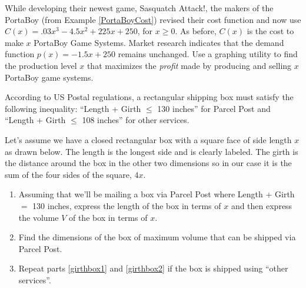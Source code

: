 \documentclass{ximera}
\begin{document}
\begin{problem}\label{newportaboycost}
While developing their newest game, Sasquatch Attack!, the makers of the PortaBoy (from Example \ref{PortaBoyCost}) revised their cost function and now use $C(x) = .03x^{3} - 4.5x^{2} + 225x + 250$, for $x \geq 0$. As before, $C(x)$ is the cost to make $x$ PortaBoy Game Systems.  Market research indicates that the demand function $p(x) = -1.5x + 250$ remains unchanged.  Use a graphing utility to find the production level $x$ that maximizes the \textit{profit} made by producing and selling $x$ PortaBoy game systems.
\end{problem}

\begin{problem}
According to US Postal regulations, a rectangular shipping box must satisfy the following inequality: ``Length + Girth $\leq$ 130 inches'' for Parcel Post and ``Length + Girth $\leq$ 108 inches'' for other services. 

Let's assume we have a closed rectangular box with a square face of side length $x$ as drawn below.  The length is the longest side and is clearly labeled.  The girth is the distance around the box in the other two dimensions so in our case it is the sum of the four sides of the square, $4x$. 

\begin{enumerate}

\item \label{girthbox1} Assuming that we'll be mailing a box via Parcel Post where Length + Girth $=$ 130 inches, express the length of the box in terms of $x$ and then express the volume $V$ of the box in terms of $x$.

\item \label{girthbox2} Find the dimensions of the box of maximum volume that can be shipped via Parcel Post.

\item Repeat parts \ref{girthbox1} and \ref{girthbox2} if the box is shipped using ``other services''.

\end{enumerate}

\begin{center}



\end{center}
\end{problem}
\end{document}
